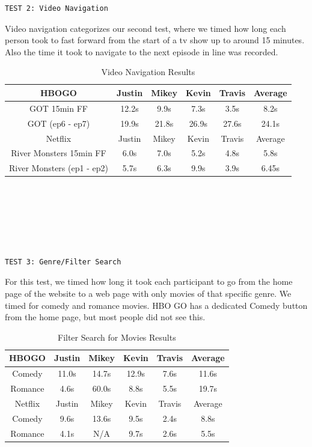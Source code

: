 \documentclass[11pt]{article}
\begin{document}
\begin{verbatim}
TEST 2: Video Navigation
\end{verbatim}
Video navigation categorizes our second test, where we timed how long each person took to fast forward from the start of a tv show up to around 15 minutes. Also the time it took to navigate to the next episode in line was recorded.

\begin{table}[ht]
\caption{Video Navigation Results} %
\centering %
\begin{tabular}{|c| c c c c |c|} %
\hline\hline %
HBOGO  &Justin& Mikey&Kevin&Travis&Average   \\ [0.5ex] %
\hline %
GOT 15min FF  &12.2s & 9.9s&7.3s&3.5s&8.2s     \\ %
GOT (ep6 - ep7) &19.9s&21.8s&26.9s&27.6s&24.1s   \\ 
\hline %
Netflix &Justin& Mikey&Kevin&Travis&Average    \\[0.5ex]
\hline
River Monsters 15min FF &6.0s&7.0s&5.2s&4.8s&5.8s \\
River Monsters (ep1 - ep2) &5.7s&6.3s&9.9s&3.9s&6.45s    \\
\hline
\end{tabular}
\label{table:nonlin} %
\end{table}


\begin{verbatim}






TEST 3: Genre/Filter Search
\end{verbatim}
For this test, we timed how long it took each participant to go from the home page of the website to a web page with only movies of that specific genre. We timed for comedy and romance movies. HBO GO has a dedicated Comedy button from the home page, but most people did not see this. 

\begin{table}[ht]
\caption{Filter Search for Movies Results} %
\centering %
\begin{tabular}{|c|c c c c|c|}   %
\hline\hline 
HBOGO  &Justin& Mikey&Kevin&Travis&Average   \\ [0.5ex] %
\hline 
Comedy  &11.0s & 14.7s&12.9s&7.6s&11.6s  \\
Romance &4.6s&60.0s&8.8s&5.5s&19.7s    \\
\hline
Netflix &Justin& Mikey&Kevin&Travis&Average     \\ [0.5ex]
\hline
Comedy &9.6s&13.6s&9.5s&2.4s&8.8s   \\ %
Romance &4.1s&N/A&9.7s&2.6s&5.5s  \\ 
\hline %
\end{tabular}
\label{table:nonlin} %
\end{table}
\end{document}

